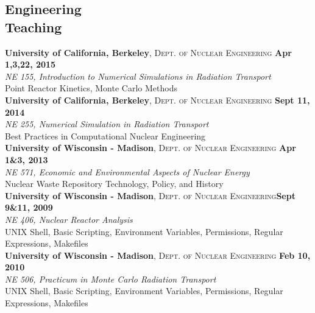 \documentclass[margin,line]{resume}
\begin{document}
\begin{resume}
    \section{\mysidestyle Engineering\\Teaching}
    \textbf{University of California, Berkeley}, \textsc{Dept. of Nuclear Engineering} \hfill \textbf{Apr 1,3,22, 2015}\\
               \textsl{NE 155, Introduction to Numerical Simulations in Radiation Transport}\\
               Point Reactor Kinetics, Monte Carlo Methods 
               \vspace{2mm}\\
    \textbf{University of California, Berkeley}, \textsc{Dept. of Nuclear Engineering} \hfill \textbf{Sept 11, 2014}\\
               \textsl{NE 255, Numerical Simulation in Radiation Transport}\\
               Best Practices in Computational Nuclear Engineering
               \vspace{2mm}\\
    \textbf{University of Wisconsin - Madison}, \textsc{Dept. of Nuclear Engineering} \hfill \textbf{Apr 1\&3, 2013}\\
               \textsl{NE 571, Economic and Environmental Aspects of Nuclear Energy}\\
               Nuclear Waste Repository Technology, Policy, and History
               \vspace{2mm}\\
    \textbf{University of Wisconsin - Madison}, \textsc{Dept. of Nuclear Engineering}\hfill \textbf{Sept 9\&11, 2009}\\
               \textsl{NE 406, Nuclear Reactor Analysis}\\
               UNIX Shell, Basic Scripting, Environment Variables, Permissions, Regular Expressions, Makefiles
               \vspace{2mm}\\
    \textbf{University of Wisconsin - Madison}, \textsc{Dept. of Nuclear
    Engineering} \hfill \textbf{Feb 10, 2010}\\
               \textsl{NE 506, Practicum in Monte Carlo Radiation Transport}\\
               UNIX Shell, Basic Scripting, Environment Variables, Permissions, Regular Expressions, Makefiles
               \vspace{2mm}


\end{resume}
\end{document}

